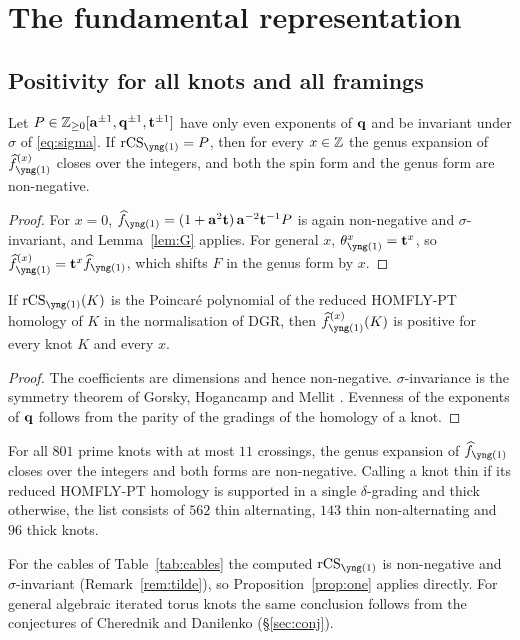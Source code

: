\section{The fundamental representation}\label{sec:one}

\subsection{Positivity for all knots and all framings}
\begin{proposition}\label{prop:one}
Let $P\in\mathbb{Z}_{\ge0}[\mathbf{a}^{\pm1},\mathbf{q}^{\pm1},\mathbf{t}^{\pm1}]$ have only even exponents of $\mathbf{q}$ and be invariant under $\sigma$ of \eqref{eq:sigma}.
If $\rCS_{\yng(1)}=P$, then for every $x\in\mathbb{Z}$ the genus expansion of $\hf^{(x)}_{\yng(1)}$ closes over the integers, and both the spin form and the genus form are non-negative.
\end{proposition}
\begin{proof}
For $x=0$, $\hf_{\yng(1)}=(1+\ba^2\bt)\,\ba^{-2}\bt^{-1}P$ is again non-negative and $\sigma$-invariant, and Lemma~\ref{lem:G} applies.
For general $x$, $\theta_{\yng(1)}^x=\bt^x$, so $\hf^{(x)}_{\yng(1)}=\bt^x\hf_{\yng(1)}$, which shifts $F$ in the genus form by $x$.
\end{proof}
\begin{corollary}\label{cor:one}
If $\rCS_{\yng(1)}(K)$ is the Poincar\'e polynomial of the reduced HOMFLY-PT homology of $K$ in the normalisation of DGR, then $\hf^{(x)}_{\yng(1)}(K)$ is positive for every knot $K$ and every $x$.
\end{corollary}
\begin{proof}
The coefficients are dimensions and hence non-negative. $\sigma$-invariance is the symmetry theorem of Gorsky, Hogancamp and Mellit \cite{Gorsky21}.
Evenness of the exponents of $\mathbf{q}$ follows from the parity of the gradings of the homology of a knot.
\end{proof}

\begin{compresult}\label{cr:table}
For all $801$ prime knots with at most $11$ crossings, the genus expansion of $\hf_{\yng(1)}$ closes over the integers and both forms are non-negative.
Calling a knot thin if its reduced HOMFLY-PT homology is supported in a single $\delta$-grading and thick otherwise,
the list consists of $562$ thin alternating, $143$ thin non-alternating and $96$ thick knots.
\end{compresult}
For the cables of Table~\ref{tab:cables} the computed $\rCS_{\yng(1)}$ is non-negative and $\sigma$-invariant (Remark~\ref{rem:tilde}), so Proposition~\ref{prop:one} applies directly.
For general algebraic iterated torus knots the same conclusion follows from the conjectures of Cherednik and Danilenko (\S\ref{sec:conj}).

